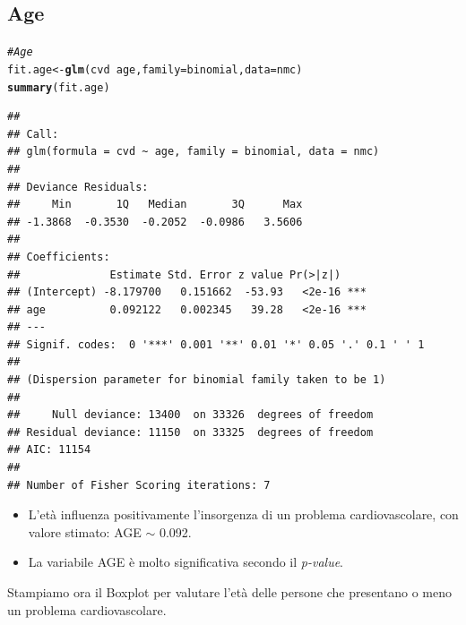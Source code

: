 \documentclass{article}\usepackage[]{graphicx}\usepackage[]{xcolor}
\makeatletter
\newcommand{\hlcom}[1]{\textcolor[rgb]{0.678,0.584,0.686}{\textit{#1}}}%
\newcommand{\hlopt}[1]{\textcolor[rgb]{0,0,0}{#1}}%
\newcommand{\hlstd}[1]{\textcolor[rgb]{0.345,0.345,0.345}{#1}}%
\newcommand{\hlkwb}[1]{\textcolor[rgb]{0.69,0.353,0.396}{#1}}%
\newcommand{\hlkwc}[1]{\textcolor[rgb]{0.333,0.667,0.333}{#1}}%
\newcommand{\hlkwd}[1]{\textcolor[rgb]{0.737,0.353,0.396}{\textbf{#1}}}%
\newenvironment{kframe}{%
 \def\at@end@of@kframe{}%
 \ifinner\ifhmode%
  \def\at@end@of@kframe{\end{minipage}}%
  \begin{minipage}{\columnwidth}%
 \fi\fi%
 \def\FrameCommand##1{\hskip\@totalleftmargin \hskip-\fboxsep
 \colorbox{shadecolor}{##1}\hskip-\fboxsep
     \hskip-\linewidth \hskip-\@totalleftmargin \hskip\columnwidth}%
 \MakeFramed {\advance\hsize-\width
   \@totalleftmargin\z@ \linewidth\hsize
   \@setminipage}}%
 {\par\unskip\endMakeFramed%
 \at@end@of@kframe}
\newenvironment{knitrout}{}{} %
\makeatother
\begin{document}
  \subsection{Age}
\begin{knitrout}
\color{fgcolor}\begin{kframe}
\begin{alltt}
\hlcom{#Age}
\hlstd{fit.age} \hlkwb{<-} \hlkwd{glm}\hlstd{(cvd}\hlopt{~}\hlstd{age,} \hlkwc{family}\hlstd{=binomial,} \hlkwc{data}\hlstd{=nmc)}
\hlkwd{summary}\hlstd{(fit.age)}
\end{alltt}
\begin{verbatim}
## 
## Call:
## glm(formula = cvd ~ age, family = binomial, data = nmc)
## 
## Deviance Residuals: 
##     Min       1Q   Median       3Q      Max  
## -1.3868  -0.3530  -0.2052  -0.0986   3.5606  
## 
## Coefficients:
##              Estimate Std. Error z value Pr(>|z|)    
## (Intercept) -8.179700   0.151662  -53.93   <2e-16 ***
## age          0.092122   0.002345   39.28   <2e-16 ***
## ---
## Signif. codes:  0 '***' 0.001 '**' 0.01 '*' 0.05 '.' 0.1 ' ' 1
## 
## (Dispersion parameter for binomial family taken to be 1)
## 
##     Null deviance: 13400  on 33326  degrees of freedom
## Residual deviance: 11150  on 33325  degrees of freedom
## AIC: 11154
## 
## Number of Fisher Scoring iterations: 7
\end{verbatim}
\end{kframe}
\end{knitrout}
    
    \begin{itemize}
      \item L'età influenza positivamente l'insorgenza di un problema 
            cardiovascolare, con valore stimato: AGE $\sim$ 0.092. 
      \item La variabile AGE è molto significativa secondo il \emph{p-value}.
    \end{itemize}
    
    Stampiamo ora il Boxplot per valutare l'età delle persone che presentano
    o meno un problema cardiovascolare.
    
\end{document}
